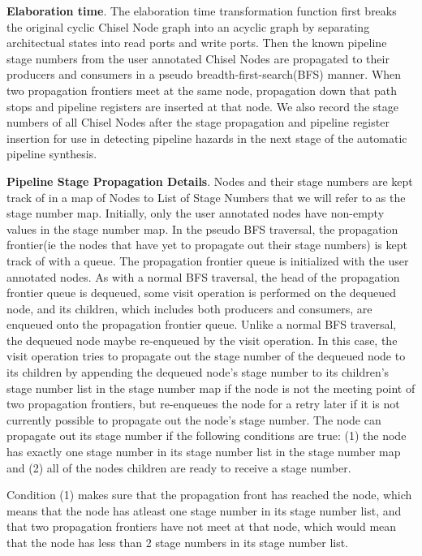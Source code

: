 {\bf Elaboration time}. The elaboration time transformation function first breaks the original cyclic Chisel Node graph into an acyclic graph by separating architectual states into read ports and write ports. Then the known pipeline stage numbers from the user annotated Chisel Nodes are propagated to their producers and consumers in a pseudo breadth-first-search(BFS) manner. When two propagation frontiers meet at the same node, propagation down that path stops and pipeline registers are inserted at that node. We also record the stage numbers of all Chisel Nodes after the stage propagation and pipeline register insertion for use in detecting pipeline hazards in the next stage of the automatic pipeline synthesis.

{\bf Pipeline Stage Propagation Details}. Nodes and their stage numbers are kept track of in a map of Nodes to List of Stage Numbers that we will refer to as the stage number map. Initially, only the user annotated nodes have non-empty values in the stage number map. In the pseudo BFS traversal, the propagation frontier(ie the nodes that have yet to propagate out their stage numbers) is kept track of with a queue. The propagation frontier queue is initialized with the user annotated nodes. As with a normal BFS traversal, the head of the propagation frontier queue is dequeued, some visit operation is performed on the dequeued node, and its children, which includes both producers and consumers, are enqueued onto the propagation frontier queue. Unlike a normal BFS traversal, the dequeued node maybe re-enqueued by the visit operation. In this case, the visit operation tries to propagate out the stage number of the dequeued node to its children by appending the dequeued node's stage number to its children's stage number list in the stage number map if the node is not the meeting point of two propagation frontiers, but re-enqueues the node for a retry later if it is not currently possible to propagate out the node's stage number. The node can propagate out its stage number if the following conditions are true: (1) the node has exactly one stage number in its stage number list in the stage number map and (2) all of the nodes children are ready to receive a stage number. 

Condition (1) makes sure that the propagation front has reached the node, which means that the node has atleast one stage number in its stage number list, and that two propagation frontiers have not meet at that node, which would mean that the node has less than 2 stage numbers in its stage number list. 

